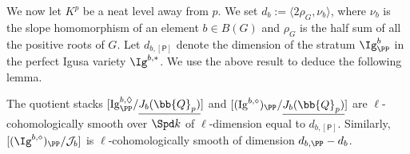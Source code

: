 \documentclass[letterpaper,11pt]{amsart}
\begin{document}
We now let $K^{p}$ be a neat level away from $p$. We set $d_{b} := \langle 2\rho_{G},\nu_{b} \rangle$, where $\nu_{b}$ is the slope homomorphism of an element $b \in B(G)$ and $\rho_{G}$ is the half sum of all the positive roots of $G$. Let $d_{b,[\mathsf{P}]}$ denote the dimension of the stratum $\Ig^b_{\PP}$ in the perfect Igusa variety $\Ig^{b,\ast}$. We use the above result to deduce the following lemma.  
\begin{lemma}\label{lemma: StrataFiberwiseSmooth}
     The quotient stacks $[\mathrm{Ig}^{b,\Diamond}_{\PP}/\underline{J_{b}(\bb{Q}_{p})}]$ and $[(\mathrm{Ig}^{b,\diamond})_{\PP}/\underline{J_{b}(\bb{Q}_{p})}]$ are $\ell$-cohomologically smooth over $\Spd k$ of $\ell$-dimension equal to $d_{b,[\mathsf{P}]}$. Similarly, $[(\Ig^{b,\diamond})_{\PP}/\mathcal{J}_{b}]$ is $\ell$-cohomologically smooth of dimension $d_{b,\PP} - d_{b}$.
\end{lemma}
\end{document}
